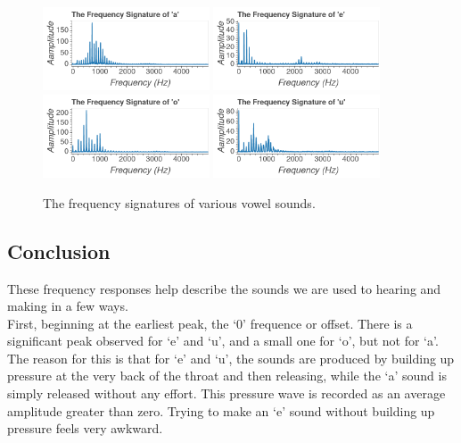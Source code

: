 \documentclass[aps,prl,reprint]{revtex4-2}
\begin{document}
\begin{figure}[h]
\includegraphics[width=0.44\textwidth]{../Images/l5_E_a.png}
\includegraphics[width=0.44\textwidth]{../Images/l5_E_e.png}
\includegraphics[width=0.44\textwidth]{../Images/l5_E_o.png}
\includegraphics[width=0.44\textwidth]{../Images/l5_E_u.png}
\caption{\label{vowles} The frequency signatures of various vowel sounds.}
\end{figure}

\subsection{Conclusion}

These frequency responses help describe the sounds we are used to hearing
and making in a few ways. \\

First, beginning at the earliest peak, the `0' frequence or offset.
There is a significant peak observed for `e'
and `u', and a small one for `o', but not for `a'. The reason for this is
that for `e' and `u', the sounds are produced by building up pressure at
the very back of the throat and then releasing, while the `a' sound is
simply released without any effort. This pressure wave is recorded as an 
average amplitude greater than zero. Trying to make an `e' sound without
building up pressure feels very awkward. \\
\end{document}

